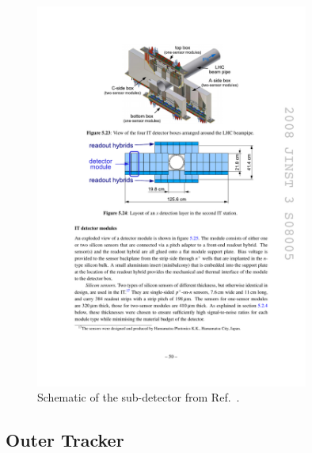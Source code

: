 \begin{figure}[!h]
    \centering
    \includegraphics[width=0.8\textwidth]{figs/Detector/it_layout.pdf}
    \caption{Schematic of the \intr sub-detector from Ref.~\cite{Alves:2008zz}.}
    \label{fig:Dec_it_layout}   
\end{figure}



\subsection{Outer Tracker}


